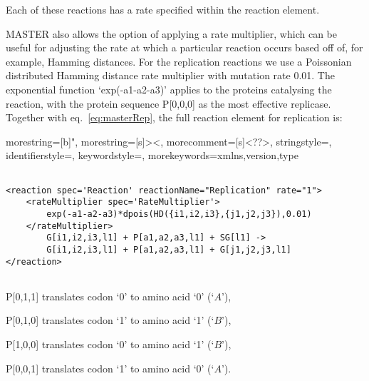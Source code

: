 \documentclass{article}
\begin{document}
Each of these reactions has a rate specified within the reaction element.  

MASTER also allows the option of applying a rate multiplier, which can be useful for adjusting the rate at which a particular reaction occurs based off of, for example, Hamming distances.
For the replication reactions we use a Poissonian distributed Hamming distance rate multiplier with mutation rate 0.01.  
The exponential function `exp(-a1-a2-a3)' applies to the proteins catalysing the reaction, with the protein sequence P[0,0,0] as the most effective replicase.  
Together with eq.~\ref{eq:masterRep}, the full reaction element for replication is: 


{
  morestring=[b]",
  morestring=[s]{>}{<},
  morecomment=[s]{<?}{?>},
  stringstyle=\color{black},
  identifierstyle=\color{darkblue},
  keywordstyle=\color{cyan},
  morekeywords={xmlns,version,type}%
}

\footnotesize{
\begin{lstlisting}

<reaction spec='Reaction' reactionName="Replication" rate="1">
    <rateMultiplier spec='RateMultiplier'> 
        exp(-a1-a2-a3)*dpois(HD({i1,i2,i3},{j1,j2,j3}),0.01)
    </rateMultiplier>
        G[i1,i2,i3,l1] + P[a1,a2,a3,l1] + SG[l1] ->  
        G[i1,i2,i3,l1] + P[a1,a2,a3,l1] + G[j1,j2,j3,l1]
</reaction>         
        
\end{lstlisting}}

\normalsize{ 

P[0,1,1] translates codon `0' to amino acid `0' (`$A$'), 

P[0,1,0] translates codon `1' to amino acid `1' (`$B$'), 

P[1,0,0] translates codon `0' to amino acid `1' (`$B$'),  

P[0,0,1] translates codon `1' to amino acid `0' (`$A$').  

}
\end{document}
